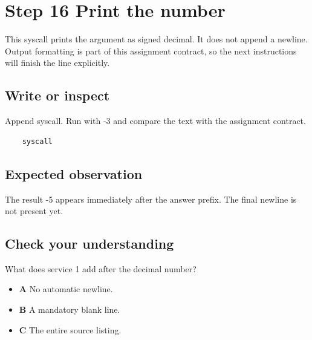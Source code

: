 \section{Step 16 Print the
  number}\label{001-console-calculation-s16-step-16-print-the-number}

This syscall prints the argument as signed decimal. It does not append a
newline. Output formatting is part of this assignment contract, so the
next instructions will finish the line explicitly.

\subsection{Write or
  inspect}\label{001-console-calculation-s16-write-or-inspect}

Append syscall. Run with -3 and compare the text with the assignment
contract.

\begin{verbatim}
    syscall
\end{verbatim}

\subsection{Expected
  observation}\label{001-console-calculation-s16-expected-observation}

The result -5 appears immediately after the answer prefix. The final
newline is not present yet.

\subsection{Check your
  understanding}\label{001-console-calculation-s16-check-your-understanding}

What does service 1 add after the decimal number?

\begin{itemize}
  \tightlist
  \item
        \textbf{A} No automatic newline.
  \item
        \textbf{B} A mandatory blank line.
  \item
        \textbf{C} The entire source listing.
\end{itemize}
